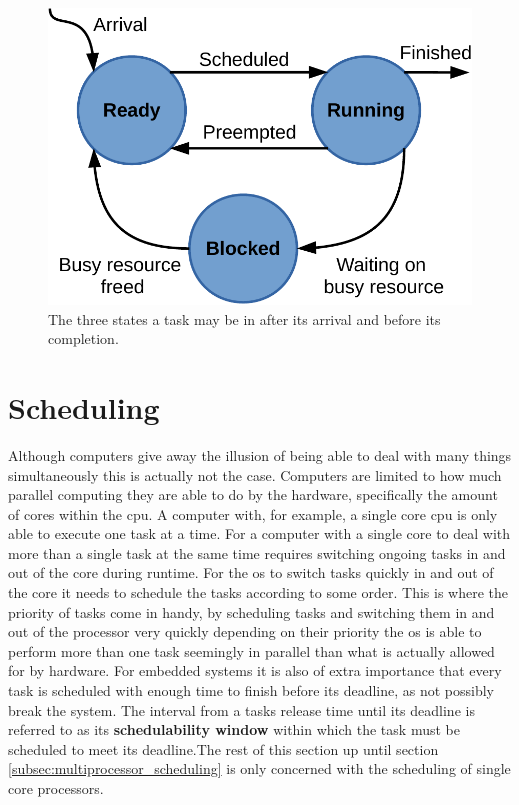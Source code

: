 \documentclass{kththesis}
\begin{document}
\begin{figure}

    \centering

    \includegraphics[width=0.7\linewidth]{images/ready-running-blocked-model.pdf}

    \caption{The three states a task may be in after its arrival and before its completion.}

    \label{fig:ready_running_blocked_model}

\end{figure}



\section{Scheduling} \label{sec:scheduling}

Although computers give away the illusion of being able to deal with many things simultaneously this
is actually not the case. Computers are limited to how much parallel computing they are able to do
by the hardware, specifically the amount of cores within the \acrshort{cpu}. A computer with, for
example, a single core \acrshort{cpu} is only able to execute one task at a time. For a computer
with a single core to deal with more than a single task at the same time requires switching ongoing
tasks in and out of the core during runtime. For the \acrshort{os} to switch tasks quickly in and
out of the core it needs to schedule the tasks according to some order. This is where the priority
of tasks come in handy, by scheduling tasks and switching them in and out of the processor very
quickly depending on their priority the \acrshort{os} is able to perform more than one task seemingly in
parallel than what is actually allowed for by hardware. For embedded systems it is also of extra
importance that every task is scheduled with enough time to finish before its deadline, as not
possibly break the system. The interval from a tasks release time until its deadline is referred to
as its \textbf{schedulability window} within which the task must be scheduled to meet its
deadline.The rest of this section up until section \ref{subsec:multiprocessor_scheduling} is only
concerned with the scheduling of single core processors.
\end{document}
